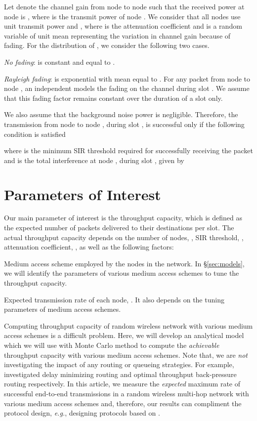 \documentclass[12pt,english]{article}
\begin{document}
Let  denote the channel gain from node  to node  such that the received power at node  is , where  is the transmit power of node . We consider that all nodes use unit transmit power and \mbox{}, where \mbox{} is the attenuation coefficient and  is a random variable of unit mean representing the variation in channel gain because of fading. For the distribution of , we consider the following two cases.
\begin{compactenum}[-]
\item {\em No fading}:  is constant and equal to .
\item {\em Rayleigh fading}:  is exponential with mean equal to . For any packet from node  to node , an independent \mbox{} models the fading on the channel during slot . We assume that this fading factor remains constant over the duration of a slot only.
\end{compactenum}
We also assume that the background noise power is negligible. Therefore, the transmission from node  to node , during slot , is successful only if the following condition is satisfied

where  is the minimum SIR threshold required for successfully receiving the packet and  is the total interference at node , during slot , given by


\section{Parameters of Interest}
\label{sec:interest}

Our main parameter of interest is the throughput capacity,  which is defined as the expected number of packets delivered to their destinations per slot. The actual throughput capacity depends on the number of nodes, , SIR threshold, , attenuation coefficient, , as well as the following factors:
\begin{compactenum}[-]
\item Medium access scheme employed by the nodes in the network. In \S \ref{sec:models}, we will identify the parameters of various medium access schemes to tune the throughput capacity. 
\item Expected transmission rate of each node, . It also depends on the tuning parameters of medium access schemes.
\end{compactenum}

Computing throughput capacity of random wireless network with various medium access schemes is a difficult problem. Here, we will develop an analytical model which we will use with Monte Carlo method to compute the {\em achievable} throughput capacity with various medium access schemes. Note that, we are {\em not} investigating the impact of any routing or queueing strategies. For example, \cite{Stamatiou,Georgiadis} investigated delay minimizing routing and optimal throughput back-pressure routing respectively. In this article, we measure the {\em expected} maximum rate of successful end-to-end transmissions in a random wireless multi-hop network with various medium access schemes and, therefore, our results can compliment the protocol design, {\it e.g.}, designing protocols based on \cite{Stamatiou,Georgiadis}. 
\end{document}
